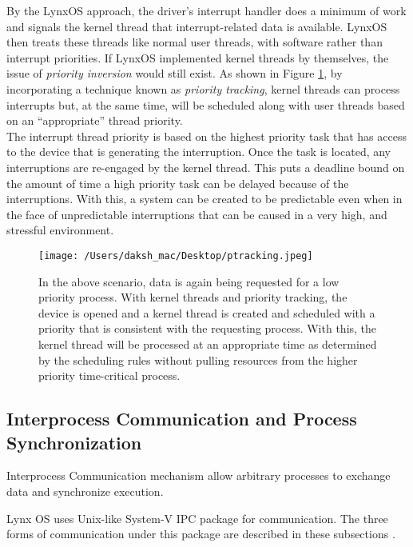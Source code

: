\documentclass[12pt]{article}
\begin{document}
By the LynxOS approach, the driver's interrupt handler does a minimum of work and
signals the kernel thread that interrupt-related data is available. LynxOS then treats these
threads like normal user threads, with software rather than interrupt priorities. If LynxOS
implemented kernel threads by themselves, the issue of \emph{priority inversion} would still
exist. As shown in Figure \ref{fig:ptrack}, by incorporating a technique known as \emph{priority tracking},
kernel threads can process interrupts but, at the same time, will be scheduled along with
user threads based on an “appropriate” thread priority. \\

The interrupt thread priority is based on the
highest priority task that has access to the device that is generating the interruption. Once the
task is located, any interruptions are re-engaged by the kernel thread. This puts a deadline bound
on the amount of time a high priority task can be delayed because of the interruptions. With this,
a system can be created to be predictable even when in the face of unpredictable interruptions
that can be caused in a very high, and stressful environment.

\begin{figure}[H]
	\centering
	\texttt{[image: /Users/daksh\_mac/Desktop/ptracking.jpeg]}
	\caption[About Priority Tracking]{In the above scenario, data is again being requested for a low priority process. With
kernel threads and priority tracking, the device is opened and a kernel thread is created
and scheduled with a priority that is consistent with the requesting process. With this, the
kernel thread will be processed at an appropriate time as determined by the scheduling
rules without pulling resources from the higher priority time-critical process.}
	\label{fig:ptrack}	
\end{figure}

\subsection{Interprocess Communication and Process Synchronization}

Interprocess Communication mechanism allow arbitrary processes to exchange data and synchronize execution. 

Lynx OS uses Unix-like System-V IPC package for communication. The three forms of communication under this package are described in these subsections \cite{ref:twelve}.
\end{document}

